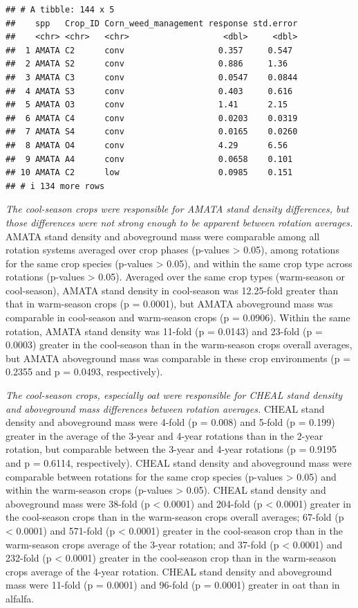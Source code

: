 \documentclass[
]{article}
\begin{document}
\begin{verbatim}
## # A tibble: 144 x 5
##    spp   Crop_ID Corn_weed_management response std.error
##    <chr> <chr>   <chr>                   <dbl>     <dbl>
##  1 AMATA C2      conv                   0.357     0.547 
##  2 AMATA S2      conv                   0.886     1.36  
##  3 AMATA C3      conv                   0.0547    0.0844
##  4 AMATA S3      conv                   0.403     0.616 
##  5 AMATA O3      conv                   1.41      2.15  
##  6 AMATA C4      conv                   0.0203    0.0319
##  7 AMATA S4      conv                   0.0165    0.0260
##  8 AMATA O4      conv                   4.29      6.56  
##  9 AMATA A4      conv                   0.0658    0.101 
## 10 AMATA C2      low                    0.0985    0.151 
## # i 134 more rows
\end{verbatim}

\emph{The cool-season crops were responsible for AMATA stand density differences, but those differences were not strong enough to be apparent between rotation averages.} AMATA stand density and aboveground mass were comparable among all rotation systems averaged over crop phases (p-values \textgreater{} 0.05), among rotations for the same crop species (p-values \textgreater{} 0.05), and within the same crop type across rotations (p-values \textgreater{} 0.05). Averaged over the same crop types (warm-season or cool-season), AMATA stand density in cool-season was 12.25-fold greater than that in warm-season crops (p = 0.0001), but AMATA aboveground mass was comparable in cool-season and warm-season crops (p = 0.0906). Within the same rotation, AMATA stand density was 11-fold (p = 0.0143) and 23-fold (p = 0.0003) greater in the cool-season than in the warm-season crops overall averages, but AMATA aboveground mass was comparable in these crop environments (p = 0.2355 and p = 0.0493, respectively).

\emph{The cool-season crops, especially oat were responsible for CHEAL stand density and aboveground mass differences between rotation averages.} CHEAL stand density and aboveground mass were 4-fold (p = 0.008) and 5-fold (p = 0.199) greater in the average of the 3-year and 4-year rotations than in the 2-year rotation, but comparable between the 3-year and 4-year rotations (p = 0.9195 and p = 0.6114, respectively). CHEAL stand density and aboveground mass were comparable between rotations for the same crop species (p-values \textgreater{} 0.05) and within the warm-season crops (p-values \textgreater{} 0.05). CHEAL stand density and aboveground mass were 38-fold (p \textless{} 0.0001) and 204-fold (p \textless{} 0.0001) greater in the cool-season crops than in the warm-season crops overall averages; 67-fold (p \textless{} 0.0001) and 571-fold (p \textless{} 0.0001) greater in the cool-season crop than in the warm-season crops average of the 3-year rotation; and 37-fold (p \textless{} 0.0001) and 232-fold (p \textless{} 0.0001) greater in the cool-season crop than in the warm-season crops average of the 4-year rotation. CHEAL stand density and aboveground mass were 11-fold (p = 0.0001) and 96-fold (p = 0.0001) greater in oat than in alfalfa.
\end{document}
